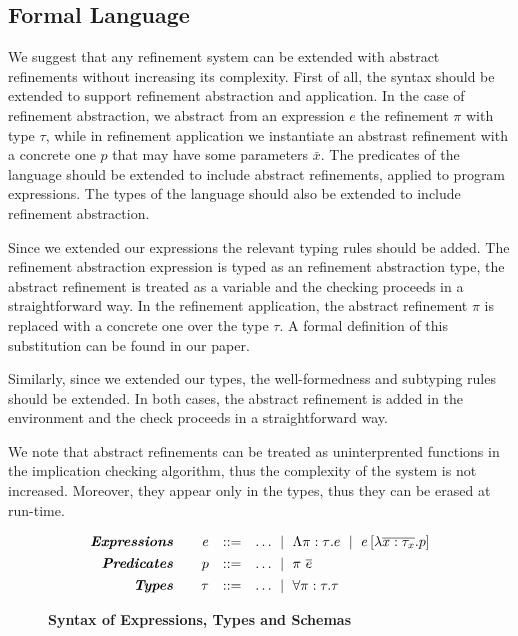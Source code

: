 \subsection{Formal Language}
We suggest that any refinement system can be extended with abstract refinements
without increasing its complexity.
%
First of all, the syntax should be extended to support refinement abstraction
and application.
In the case of refinement abstraction, we abstract from an expression $e$
the refinement $\pi$ with type $\tau$, while in refinement application
we instantiate an abstrast refinement with a concrete one $p$
that may have some parameters $\bar{x}$.
%
The predicates of the language should be extended to 
include abstract refinements, applied to program expressions.
%
The types of the language should also be extended to include 
refinement abstraction.
%

Since we extended our expressions the relevant typing rules should be added.
The refinement abstraction expression is typed as an refinement abstraction
type, the abstract refinement is treated as a variable
and the checking proceeds in a straightforward way.
In the refinement application, the abstract refinement $\pi$ is replaced with a concrete one
over the type $\tau$. A formal definition of this substitution can be found in our paper\cite{Vazou13}.

Similarly, since we extended our types, the well-formedness and subtyping 
rules should be extended.
In both cases, the abstract refinement is added in the environment
and the check proceeds in a straightforward way.

We note that
abstract refinements 
can be treated as uninterprented functions in the implication
checking algorithm, thus the complexity of the system is not increased.
Moreover, they appear only in the types, thus they can be erased at run-time.
\begin{figure}[ht!]
\centering
$$
\begin{array}{rrcl}
\emphbf{Expressions} \quad 
  & e 
  & ::= 
  & 		 \dots
  \spmid \epabs{\rvar}{\tau}{e}
  \spmid \epapp{e}{\efunbar{x:\tau_x}{p}} 
  \\[0.05in] 

\emphbf{Predicates} \quad 
  & p
  & ::= 
  &		\dots
  \spmid \rvapp{\rvar}{e}  
  \\[0.05in] 
\emphbf{Types} \quad 
  & \tau 
  & ::= 
  &		 \dots
  \spmid \tpabs{\rvar}{\tau}{\tau}

\end{array}
$$
\caption{\textbf{Syntax of Expressions, Types and Schemas}}
\label{fig:syntax}
\end{figure}


